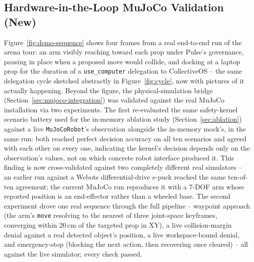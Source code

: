 \documentclass[conference]{IEEEtran}
\begin{document}
\subsection{Hardware-in-the-Loop MuJoCo Validation (New)}
\label{sec:mujoco-real}
Figure~\ref{fig:demo-sequence} shows four frames from a real end-to-end run of the arena tour: an arm
visibly reaching toward each prop under Pulse's governance, pausing in place when a proposed move
would collide, and docking at a laptop prop for the duration of a \texttt{use\_computer} delegation to
CollectiveOS -- the same delegation cycle sketched abstractly in Figure~\ref{fig:cycle}, now with
pictures of it actually happening. Beyond the figure, the physical-simulation bridge (Section~\ref{sec:mujoco-integration})
was validated against the real MuJoCo installation via two experiments. The first re-evaluated the same safety-kernel
scenario battery used for the in-memory ablation study (Section~\ref{sec:ablation}) against a live
\texttt{MuJoCoRobot}'s observation alongside the in-memory mock's, in the same run: both reached perfect
decision accuracy on all ten scenarios and agreed with each other on every one, indicating the kernel's
decision depends only on the observation's values, not on which concrete robot interface produced it. This
finding is now cross-validated against two completely different real simulators -- an earlier run against a
Webots differential-drive e-puck reached the same ten-of-ten agreement; the current MuJoCo run reproduces
it with a 7-DOF arm whose reported position is an end-effector rather than a wheeled base. The second
experiment drove one real sequence through the full pipeline -- waypoint approach (the arm's \texttt{move}
resolving to the nearest of three joint-space keyframes, converging within 20\,cm of the targeted prop
in XY), a live collision-margin denial against a real detected object's position, a live workspace-bound
denial, and emergency-stop (blocking the next action, then recovering once cleared) -- all against the
live simulator; every check passed.
\end{document}
